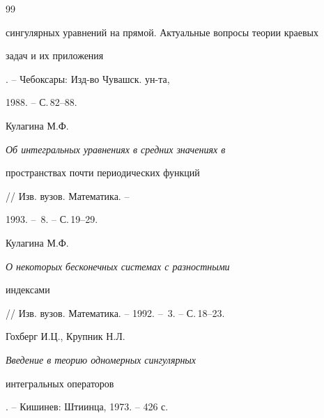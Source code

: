 \begin{thebibliography}{99}
{сингулярных уравнений на прямой. Актуальные вопросы теории краевых  


задач и их приложения}. -- Чебоксары: Изд-во Чувашск. ун-та,  


1988. -- С.\,82--88. 




Кулагина М.Ф. {\em Об интегральных уравнениях в средних значениях в  


пространствах почти периодических функций} // Изв. вузов. Математика. -- 


1993. -- \No\,8. -- С.\,19--29. 




Кулагина М.Ф. {\em О некоторых бесконечных системах с разностными  


индексами} // Изв. вузов. Математика. -- 1992. -- \No\,3. -- С.\,18--23. 




Гохберг И.Ц., Крупник Н.Л. {\em Введение в теорию одномерных сингулярных  


интегральных операторов}. -- Кишинев: Штиинца, 1973. -- 426 с. 


 


\end{thebibliography} 


 


\vskip 2cm 


 








 


\label{end} 


 


